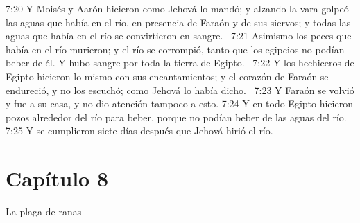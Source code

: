 7:20 Y Moisés y Aarón hicieron como Jehová lo mandó; y alzando la vara golpeó las aguas que había en el río, en presencia de Faraón y de sus siervos; y todas las aguas que había en el río se convirtieron en sangre.  
7:21 Asimismo los peces que había en el río murieron; y el río se corrompió, tanto que los egipcios no podían beber de él. Y hubo sangre por toda la tierra de Egipto.  
7:22 Y los hechiceros de Egipto hicieron lo mismo con sus encantamientos; y el corazón de Faraón se endureció, y no los escuchó; como Jehová lo había dicho.  
7:23 Y Faraón se volvió y fue a su casa, y no dio atención tampoco a esto. 
7:24 Y en todo Egipto hicieron pozos alrededor del río para beber, porque no podían beber de las aguas del río.  
7:25 Y se cumplieron siete días después que Jehová hirió el río.  
\section*{Capítulo 8}
La plaga de ranas 

